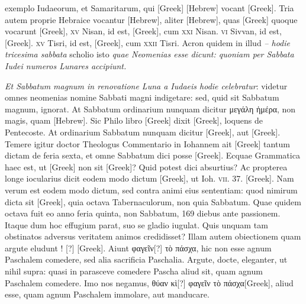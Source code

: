 exemplo Iudaeorum, et Samaritarum, qui \textgreek{[Greek]}
\texthebrew{[Hebrew]} vocant \textgreek{[Greek]}.
Tria autem proprie Hebraice vocantur \texthebrew{[Hebrew]},
aliter \texthebrew{[Hebrew]}, quas \textgreek{[Greek]} quoque vocarunt
 \textgreek{[Greek]}, \textsc{xv} Nisan, id est, \textgreek{[Greek]},
 cum \textsc{xxi} Nisan.
\textsc{vi} Sivvan,
id est, \textgreek{[Greek]}.
\textsc{xv} Tisri, id est, \textgreek{[Greek]}, cum
 \textsc{xxii} Tisri.
{}
Acron quidem in illud \textit{– hodie tricesima sabbata} scholio isto
\textit{quae Neomenias esse dicunt: quoniam per Sabbata Iudei numeros Lunares
accipiunt.}

\textit{Et Sabbatum magnum in renovatione Luna a Iudaeis
hodie celebratur}: videtur omnes neomenias nomine Sabbati
magni indigetare: sed, quid sit Sabbatum magnum, ignorat.
At
Sabbatum ordinarium nunquam dicitur \textgreek{μεγάλη ἡμέρα},
 non magis,
quam \texthebrew{[Hebrew]}.
Sic Philo libro \textgreek{[Greek]} dixit \textgreek{[Greek]},
loquens de Pentecoste.
At ordinarium
Sabbatum nunquam dicitur \textgreek{[Greek]}, aut \textgreek{[Greek]}.
Temere igitur
doctor Theologus Commentario in Iohannem ait \textgreek{[Greek]}
tantum dictam de feria sexta, et omne Sabbatum dici posse \textgreek{[Greek]}.
Ecquae Grammatica haec est, ut \textgreek{[Greek]}
non sit \textgreek{[Greek]}?
Quid potest dici absurtius?
Ac propterea
longe iocularius dicit eodem modo dictum \textgreek{[Greek]},
ut Ioh. \textsc{vii}. 37. \textgreek{[Greek]}.
Nam verum est eodem modo dictum, sed
contra animi eius sententiam: quod nimirum dicta sit \textgreek{[Greek]},
quia octava Tabernaculorum, non quia Sabbatum.
Quae quidem
octava fuit eo anno feria quinta, non Sabbatum, 169 diebus ante
passionem.
Itaque dum hoc effugium parat, suo se gladio iugulat.
Quis unquam tam obstinatos adversus veritatem animos credidisset?
Illam autem obiectionem quam argute eludunt ! [?] \textgreek{[Greek]}.
Aiunt \textgreek{φαγεῖν[?] τὸ πάσχα}, hic non esse
agnum Paschalem comedere, sed alia sacrificia Paschalia.
Argute, docte, eleganter, ut nihil supra: quasi in parasceve comedere
Pascha aliud sit, quam agnum Paschalem comedere.
Imo nos negamus, \textgreek{θύαν κὶ[?] φαγεῖν τὸ πάσχα[Greek]},
 aliud esse, quam agnum Paschalem
immolare, aut manducare.
